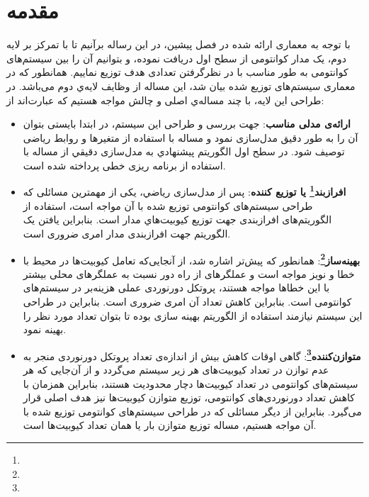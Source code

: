 \section{مقدمه}
\label{مقدمه}
با توجه به معماری ارائه شده در فصل پیشین، در این رساله برآنیم تا با تمرکز بر لایه دوم، یک مدار کوانتومی از سطح اول دریافت نموده، و بتوانیم آن را بین سیستم‌های کوانتومی به طور مناسب با در نظرگرفتن تعدادی هدف توزیع نماییم. همانطور که در معماری سیستم‌های توزیع شده بیان شد، این مساله از وظایف لایه‌ي دوم می‌باشد. در طراحی این لایه، با چند مساله‌ي اصلی و چالش مواجه هستیم که عبارت‌اند از:
\begin{itemize}
\item
\textbf{ارائه‌ی مدلی مناسب}:
جهت بررسی و طراحی این سیستم، در ابتدا بایستی بتوان آن را به طور دقیق مدل‌سازی نمود و مساله با استفاده از متغیرها و روابط ریاضی توصیف شود. در سطح اول الگوريتم پيشنهادي به مدل‌سازی دقیقي از مساله با استفاده از برنامه ریزی خطی پرداخته شده است.
\item
\textbf{ افرازبند\footnote{} یا توزیع کننده}:
پس از مدل‌سازی رياضي، یکی از مهمترین مسائلی که طراحی سیستم‌های کوانتومی توزیع شده با آن مواجه است، استفاده از الگوریتم‌های افرازبندی جهت توزيع كيوبيت‌هاي مدار است. بنابراین یافتن یک الگوریتم جهت افرازبندی مدار امری ضروری است. 
\item
\textbf{بهینه‌ساز\footnote{}}:
همانطور که پیش‌تر اشاره شد، از آنجایی‌که تعامل کیوبیت‌ها در محیط با خطا و نویز مواجه است و عملگرهای از راه دور نسبت به عملگرهای محلی بیشتر با این خطاها مواجه هستند، پروتکل دورنوردی عملی هزینه‌بر در سیستم‌های کوانتومی است. بنابراین کاهش تعداد آن امری ضروری است. بنابراین در طراحی این سیستم نیازمند استفاده از الگوریتم بهینه سازی بوده تا بتوان تعداد مورد نظر را بهینه نمود.%
\item
\textbf{متوازن‌کننده\footnote{}}:
گاهی اوقات کاهش بیش از اندازه‌ی تعداد پروتکل دورنوردی منجر به عدم توازن در تعداد کیوبیت‌های هر زیر سیستم می‌گردد و از آن‌جایی که هر سیستم‌های کوانتومی در تعداد کیوبیت‌ها دچار محدودیت هستند، بنابراین همزمان با کاهش تعداد دورنوردی‌های کوانتومی، توزیع متوازن کیوبیت‌ها نیز هدف اصلی قرار می‌گیرد. بنابراین از دیگر مسائلی که در طراحی سیستم‌های کوانتومی توزیع شده با آن مواجه هستیم، مساله توزیع متوازن بار یا همان تعداد کیوبیت‌ها است. 
\end{itemize}

